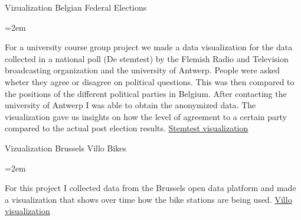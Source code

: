 \documentclass{scrartcl}
\newcommand{\Description}[1]{\hangindent=2em\hangafter=0\noindent\raggedright\footnotesize{#1}\par\normalsize\vspace{1em}} %
\begin{document}
\begin{cv}{}

\vspace{1em} %


\vspace{1em}

Vizualization Belgian Federal Elections
\newline

\Description{
For a university course group project we made a data visualization for the data collected in a national poll (De stemtest) by the Flemish Radio and Television broadcasting organization and the university of Antwerp. People were asked wheter they agree or disagree on political questions. This was then compared to the positions of the different political parties in Belgium. After contacting the university of Antwerp I was able to obtain the anonymized data. The visualization gave us insights on how the level of agreement to a certain party compared to the actual post election results.
\newline\href{https://young-lake-76803.herokuapp.com/}{Stemtest visualization}
}

Vizualization Brussels Villo Bikes
\newline

\Description{
For this project I collected data from the Brussels open data platform and made a visualization that shows over time how the bike stations are being used. 
\newline\href{https://jenyckee.github.io/posts/villoviz/}{Villo visualization}
}



\vspace{1em} %

\vspace{1em}


\vspace{1em}

\newlength{\langbox} %
\settowidth{\langbox}{English} %


\end{cv}
\end{document}
